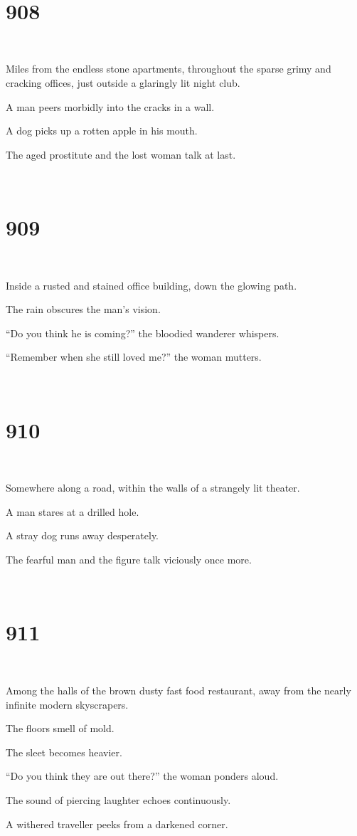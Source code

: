 \documentclass{report}
\begin{document}
~
\chapter*{908}
~

Miles from the endless stone apartments, throughout the sparse grimy and cracking offices, just outside a glaringly lit night club.

A man peers morbidly into the cracks in a wall.

A dog picks up a rotten apple in his mouth.

The aged prostitute and the lost woman talk at last.

~
\chapter*{909}
~

Inside a rusted and stained office building, down the glowing path.

The rain obscures the man's vision.

``Do you think he is coming?'' the bloodied wanderer whispers.

``Remember when she still loved me?'' the woman mutters.

~
\chapter*{910}
~

Somewhere along a road, within the walls of a strangely lit theater.

A man stares at a drilled hole.

A stray dog runs away desperately.

The fearful man and the figure talk viciously once more.

~
\chapter*{911}
~

Among the halls of the brown dusty fast food restaurant, away from the nearly infinite modern skyscrapers.

The floors smell of mold.

The sleet becomes heavier.

``Do you think they are out there?'' the woman ponders aloud.

The sound of piercing laughter echoes continuously.

A withered traveller peeks from a darkened corner.
\end{document}
